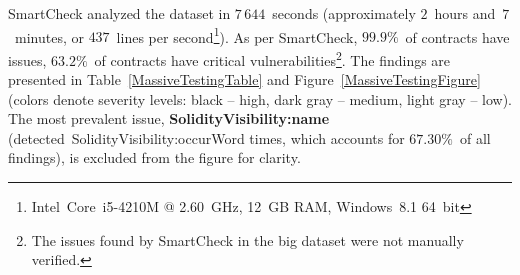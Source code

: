 SmartCheck analyzed the dataset in $7\,644$~seconds (approximately $2$~hours and~$7$~minutes, or $437$~lines per second\footnote{Intel~Core~i5-4210M @ 2.60~GHz, 12~GB RAM, Windows~8.1 64~bit}).
As per SmartCheck, $99.9\%$~of contracts have issues, $63.2\%$~of contracts have critical vulnerabilities\footnote{The issues found by SmartCheck in the big dataset were not manually verified.}.
The findings are presented in Table~\ref{MassiveTestingTable} and Figure~\ref{MassiveTestingFigure} (colors denote severity levels: black -- high, dark gray -- medium, light gray -- low).
The most prevalent issue, \textbf{\let\letcs\texapiletcs \usevalue SolidityVisibility:name \let\letcs\etoolboxletcs} (detected~{\let\letcs\texapiletcs \usevalue SolidityVisibility:occurWord \let\letcs\etoolboxletcs} times, which accounts for $67.30\%$~of all findings), is excluded from the figure for clarity.

